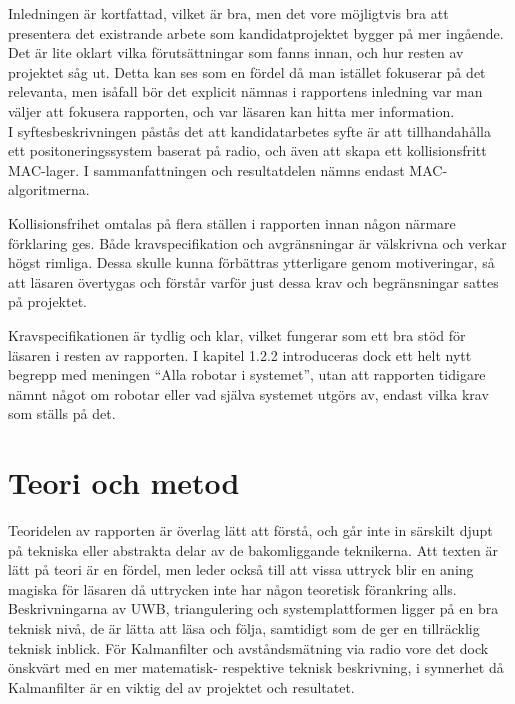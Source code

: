 \documentclass[a4paper,11pt]{article}
\begin{document}
Inledningen är kortfattad, vilket är bra, men det vore möjligtvis bra att presentera det existrande arbete som kandidatprojektet bygger på mer ingående. Det är lite oklart vilka förutsättningar som fanns innan, och hur resten av projektet såg ut. Detta kan ses som en fördel då man istället fokuserar på det relevanta, men isåfall bör det explicit nämnas i rapportens inledning var man väljer att fokusera rapporten, och var läsaren kan hitta mer information. \\

I syftesbeskrivningen påstås det att kandidatarbetes syfte är att tillhandahålla ett positoneringssystem baserat på radio, och även att skapa ett kollisionsfritt MAC-lager. I sammanfattningen och resultatdelen nämns endast MAC-algoritmerna.

Kollisionsfrihet omtalas på flera ställen i rapporten innan någon närmare förklaring ges. Både kravspecifikation och avgränsningar är välskrivna och verkar högst rimliga. Dessa skulle kunna förbättras ytterligare genom motiveringar, så att läsaren övertygas och förstår varför just dessa krav och begränsningar sattes på projektet.

Kravspecifikationen är tydlig och klar, vilket fungerar som ett bra stöd för läsaren i resten av rapporten. I kapitel 1.2.2 introduceras dock ett helt nytt begrepp med meningen “Alla robotar i systemet”, utan att rapporten tidigare nämnt något om robotar eller vad själva systemet utgörs av, endast vilka krav som ställs på det. \\ 

\section{Teori och metod}

Teoridelen av rapporten är överlag lätt att förstå, och går inte in särskilt djupt på tekniska eller abstrakta delar av de bakomliggande teknikerna. Att texten är lätt på teori är en fördel, men leder också till att vissa uttryck blir en aning magiska för läsaren då uttrycken inte har någon teoretisk förankring alls. \\

Beskrivningarna av UWB, triangulering och systemplattformen ligger på en bra teknisk nivå, de är lätta att läsa och följa, samtidigt som de ger en tillräcklig teknisk inblick. För Kalmanfilter och avståndsmätning via radio vore det dock önskvärt med en mer matematisk- respektive teknisk beskrivning, i synnerhet då Kalmanfilter är en viktig del av projektet och resultatet. \\
\end{document}
